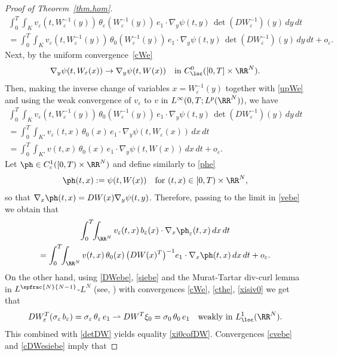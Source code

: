 \begin{proof}[Proof of Theorem~\ref{thm.hom}]
\begin{multline*}
 \int_0^T\!\!\int_{K}v_\varepsilon(t,W_\varepsilon^{-1}(y))\,\theta_\varepsilon(W_\varepsilon^{-1}(y))\,e_1\cdot\nabla_y\psi(t,y)\,\det(DW_\varepsilon^{-1})(y)\,dy\,dt
\\
=\int_0^T\!\!\int_{K}v_\varepsilon(t,W_\varepsilon^{-1}(y))\,\theta_0(W_\varepsilon^{-1}(y))\,e_1\cdot\nabla_y\psi(t,y)\,\det(DW_\varepsilon^{-1})(y)\,dy\,dt+o_\varepsilon.
\end{multline*}
Next, by the uniform convergence~\eqref{cWe}
\[
\nabla_y\psi(t,W_\varepsilon(x))\to\nabla_y\psi(t,W(x))\quad\mbox{in }C^0_\loc([0,T]\times\RR^N).
\]
Then, making the inverse change of variables $x=W_\varepsilon^{-1}(y)$ together with \eqref{upWe} and using the weak convergence of $v_\varepsilon$ to $v$ in $L^\infty(0,T;L^p(\RR^N))$, we have
\begin{multline*}
 \int_0^T\!\!\int_{K}v_\varepsilon(t,W_\varepsilon^{-1}(y))\,\theta_0(W_\varepsilon^{-1}(y))\,e_1\cdot\nabla_y\psi(t,y)\,\det(DW_\varepsilon^{-1})(y)\,dy\,dt
\\
= \int_0^T\!\!\int_{K'}v_\varepsilon(t,x)\,\theta_0(x)\,e_1\cdot\nabla_y\psi(t,W_\varepsilon(x))\,dx\,dt
\\
=\int_0^T\!\!\int_{K'}v(t,x)\,\theta_0(x)\,e_1\cdot\nabla_y\psi(t,W(x))\,dx\,dt+o_\varepsilon.
\end{multline*}
Let $\ph\in C^1_c([0,T)\times\RR^N)$ and define similarly to \eqref{phe}
\[
\ph(t,x):=\psi(t, W(x))\quad\mbox{for }(t,x)\in[0,T)\times\RR^N,
\]
so that $\nabla_x\ph(t,x)=DW(x)\nabla_y\psi(t,y)$.
Therefore, passing to the limit in \eqref{vebe} we obtain that
\begin{multline}\label{cvebe}
\int_0^T\!\!\int_{\RR^N}v_\varepsilon(t,x)\,b_\varepsilon(x)\cdot\nabla_x\ph_\varepsilon(t,x)\,dx\,dt
\\
=\int_0^T\!\!\int_{\RR^N}v(t,x)\,\theta_0(x)\,\big(DW(x)^T\big)^{-1}e_1\cdot\nabla_x\ph(t,x)\,dx\,dt+o_\varepsilon.
\end{multline}
On the other hand, using \eqref{DWebe}, \eqref{siebe} and the Murat-Tartar div-curl lemma in $L^{\spfrac{N}{N-1}}$-$L^N$ (see, \eg \cite[Th.\,2]{Mur}) with convergences \eqref{cWe}, \eqref{cthe}, \eqref{xisiv0} we get that
\begin{equation}\label{cDWesiebe}
DW_\varepsilon^T(\sigma_\varepsilon\,b_\varepsilon)=\sigma_\varepsilon\,\theta_\varepsilon\,e_1\rightharpoonup DW^T\xi_0=\sigma_0\,\theta_0\,e_1\quad\mbox{weakly in }L^1_\loc(\RR^N).
\end{equation}
This combined with \eqref{detDW} yields equality \eqref{xi0cofDW}.
Convergences \eqref{cvebe} and \eqref{cDWesiebe} imply that

\end{proof}
